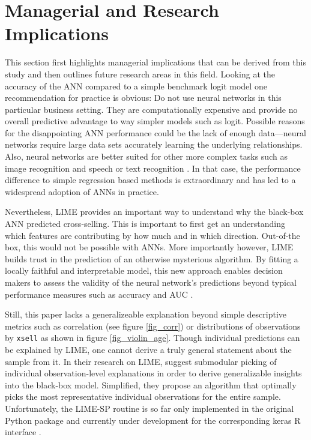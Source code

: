\documentclass[12pt,a4paper]{article}
\newcommand{\pkg}[1]{{\normalfont\fontseries{b}\selectfont #1}}
\let\proglang=\textsf
\let\code=\texttt
\begin{document}
\section{Managerial and Research Implications} \label{sec_man_impl}
This section first highlights managerial implications that can be derived from this study and then outlines future research areas in this field.
Looking at the accuracy of the ANN compared to a simple benchmark logit model one recommendation for practice is obvious:
Do not use neural networks in this particular business setting.
They are computationally expensive and provide no overall predictive advantage to way simpler models such as logit.
Possible reasons for the disappointing ANN performance could be the lack of enough data---neural networks require large data sets accurately learning
the underlying relationships.
Also, neural networks are better suited for other more complex tasks such as image recognition \citep{estevaDermatologistlevelClassificationSkin2017} and speech \citep{hintonDeepNeuralNetworks2012} or text recognition \citep{jaderbergSyntheticDataArtificial2014}.
In that case, the performance difference to simple regression based methods is extraordinary and has led to a widespread adoption of ANNs in practice.

Nevertheless, LIME  provides an important way to understand why the black-box ANN predicted cross-selling.
This is important to first get an understanding which features are contributing by how much and in which direction.
Out-of-the box, this would not be possible with ANNs.
More importantly however, LIME builds trust in the prediction of an otherwise mysterious algorithm.
By fitting a locally faithful and interpretable model, this new approach enables decision makers to assess the validity of the neural network's 
predictions beyond typical performance measures such as accuracy and AUC \citep{ribeiroWhyShouldTrust2016a}.

Still, this paper lacks a generalizeable explanation beyond simple descriptive metrics such as correlation (see figure \ref{fig_corr}) or distributions of observations by \code{xsell} as shown in figure \ref{fig_violin_age}.
Though individual predictions can be explained by LIME, one cannot derive a truly general statement about the sample from it.
In their research on LIME, \cite{ribeiroWhyShouldTrust2016a} suggest submodular picking of individual observation-level explanations in order to 
derive generalizable insights into the black-box model.
Simplified, they propose an algorithm that optimally picks the most representative individual observations for the entire sample.
Unfortunately, the LIME-SP routine is so far only implemented in the original \proglang{Python} package and currently under development for the corresponding  \pkg{keras} \proglang{R} interface \citep{kavickyLocalInterpretableModelAgnostic2017}. 
\end{document}
